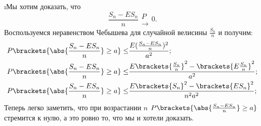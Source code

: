 \i Мы хотим доказать, что 
\[\frac{S_n - ES_n}{n} \substack{P\\\rightarrow} 0.\]
Воспользуемся неравенством Чебышева для случайной велисины $\frac{S_n}{n}$ и получим:
\begin{align*}
    P\brackets{\abs{\frac{S_n - ES_n}{n}} \geq a} \leq& \frac{E(\frac{S_n - ES_n}{n})^2}{a^2};\\ 
    P\brackets{\abs{\frac{S_n - ES_n}{n}} \geq a} \leq& \frac{E\brackets{\frac{S_n}{n}}^2 - \brackets{E\frac{S_n}{n}}^2}{a^2};\\ 
    P\brackets{\abs{\frac{S_n - ES_n}{n}} \geq a} \leq& \frac{E\brackets{S_n}^2 - \brackets{ES_n}^2}{n^2a^2};
\end{align*}
Теперь легко заметить, что при возрастании $n$ $P\brackets{\abs{\frac{S_n - ES_n}{n}} \geq a}$ стремится к нулю, а это ровно то, что мы и хотели доказать.